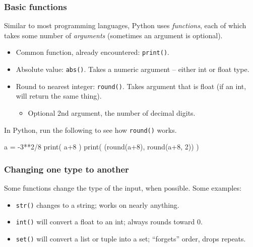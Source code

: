 \documentclass{beamer}
\newenvironment{codeblock}
    {\hfill\begin{beamerboxesrounded}[lower=codecol, width=0.8\textwidth]
    \medskip

    }
    { 
    \end{beamerboxesrounded}\hfill
    }
\theoremstyle{example}
\newcommand{\ttt}[1]{\texttt{#1}}
\begin{document}
\begin{frame}[fragile]
\frametitle{Basic functions}

Similar to most programming languages, Python uses \emph{functions}, each of which takes some number of \emph{arguments} (sometimes an argument is optional).

\begin{itemize}
	\item Common function, already encountered: \ttt{print()}.
	\pause
	\item Absolute value: \ttt{abs()}. Takes a numeric argument {--} either {\ttb int} or {\ttb float} type.
	\pause
	\item Round to nearest integer: \ttt{round()}. Takes argument that is {\ttb float} (if an {\ttb int}, will return the same thing).
	\begin{itemize}
		\item Optional 2nd argument, the number of decimal digits.
	\end{itemize}
\end{itemize}
\pause
In Python, run the following to see how \ttt{round()} works.

\begin{codeblock}

\begin{python}
a = -3**2/8
print( a+8 )
print( (round(a+8), round(a+8, 2)) )
\end{python}

\end{codeblock}

\end{frame}

\begin{frame}
\frametitle{Changing one type to another}
Some functions change the type of the input, when possible. Some examples:

\begin{itemize}
	\item \ttt{str()} changes to a string; works on nearly anything.
	\pause
	\item \ttt{int()} will convert a float to an int; always rounds toward 0.
	\pause
	\item \ttt{set()} will convert a list or tuple into a set; ``forgets'' order, drops repeats.
\end{itemize}
\end{frame}
\end{document}
